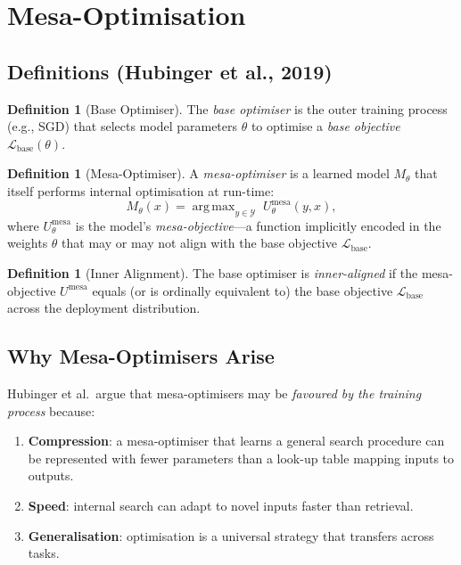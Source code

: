 \documentclass[11pt,a4paper]{article}
\theoremstyle{definition}
\newtheorem{definition}[theorem]{Definition}
\DeclareMathOperator*{\argmax}{arg\,max}
\begin{document}
\section{Mesa-Optimisation}\label{sec:mesa}

\subsection{Definitions (Hubinger et al., 2019)}

\begin{definition}[Base Optimiser]
The \emph{base optimiser} is the outer training process (e.g., SGD)
that selects model parameters $\theta$ to optimise a \emph{base
objective} $\mathcal{L}_{\text{base}}(\theta)$.
\end{definition}

\begin{definition}[Mesa-Optimiser]
A \emph{mesa-optimiser} is a learned model $M_\theta$ that itself
performs internal optimisation at run-time:
\begin{equation}
  M_\theta(x) = \argmax_{y \in \mathcal{Y}}\;
    U_\theta^{\text{mesa}}(y, x),
\end{equation}
where $U_\theta^{\text{mesa}}$ is the model's \emph{mesa-objective}---a
function implicitly encoded in the weights $\theta$ that may or may not
align with the base objective $\mathcal{L}_{\text{base}}$.
\end{definition}

\begin{definition}[Inner Alignment]
The base optimiser is \emph{inner-aligned} if the mesa-objective
$U^{\text{mesa}}$ equals (or is ordinally equivalent to) the base
objective $\mathcal{L}_{\text{base}}$ across the deployment
distribution.
\end{definition}

\subsection{Why Mesa-Optimisers Arise}

Hubinger et al.\ argue that mesa-optimisers may be \emph{favoured by
the training process} because:
\begin{enumerate}
  \item \textbf{Compression}: a mesa-optimiser that learns a general
    search procedure can be represented with fewer parameters than a
    look-up table mapping inputs to outputs.
  \item \textbf{Speed}: internal search can adapt to novel inputs faster
    than retrieval.
  \item \textbf{Generalisation}: optimisation is a universal strategy
    that transfers across tasks.
\end{enumerate}
\end{document}
